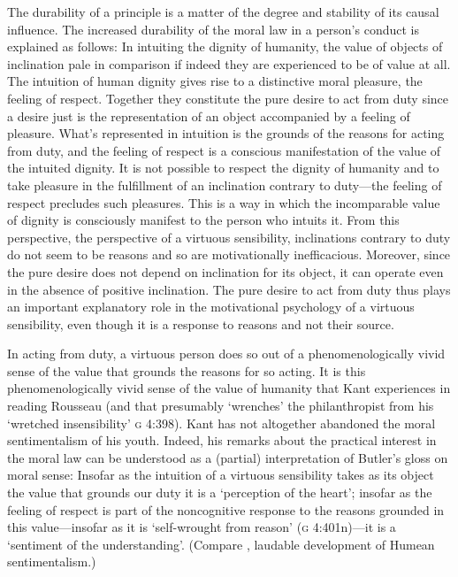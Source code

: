 \documentclass[a4paper,12pt]{article}
\begin{document}
The durability of a principle is a matter of the degree and stability of its causal influence. The increased durability of the moral law in a person's conduct is explained as follows: In intuiting the dignity of humanity, the value of objects of inclination pale in comparison if indeed they are experienced to be of value at all. The intuition of human dignity gives rise to a distinctive moral pleasure, the feeling of respect. Together they constitute the pure desire to act from duty since a desire just is the representation of an object accompanied by a feeling of pleasure. What's represented in intuition is the grounds of the reasons for acting from duty, and the feeling of respect is a conscious manifestation of the value of the intuited dignity. It is not possible to respect the dignity of humanity and to take pleasure in the fulfillment of an inclination contrary to duty---the feeling of respect precludes such pleasures. This is a way in which the incomparable value of dignity is consciously manifest to the person who intuits it. From this perspective, the perspective of a virtuous sensibility, inclinations contrary to duty do not seem to be reasons and so are motivationally inefficacious. Moreover, since the pure desire does not depend on inclination for its object, it can operate even in the absence of positive inclination. The pure desire to act from duty thus plays an important explanatory role in the motivational psychology of a virtuous sensibility, even though it is a response to reasons and not their source.

In acting from duty, a virtuous person does so out of a phenomenologically vivid sense of the value that grounds the reasons for so acting. It is this phenomenologically vivid sense of the value of humanity that Kant experiences in reading Rousseau (and that presumably `wrenches' the philanthropist from his `wretched insensibility' \textsc{g} 4:398). Kant has not altogether abandoned the moral sentimentalism of his youth. Indeed, his remarks about the practical interest in the moral law can be understood as a (partial) interpretation of Butler's \citeyearpar{Butler:1736id} gloss on moral sense: Insofar as the intuition of a virtuous sensibility takes as its object the value that grounds our duty it is a `perception of the heart'; insofar as the feeling of respect is part of the noncognitive response to the reasons grounded in this value---insofar as it is `self-wrought from reason' (\textsc{g} 4:401n)---it is a `sentiment of the understanding'. (Compare \citealp{Wiggins:1987ta}, laudable development of Humean sentimentalism.)
\end{document}
